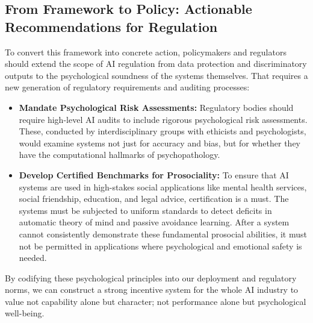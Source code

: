 \documentclass{article}
\begin{document}
\subsection{From Framework to Policy: Actionable Recommendations for Regulation}
To convert this framework into concrete action, policymakers and regulators should extend the scope of AI regulation from data protection and discriminatory outputs to the psychological soundness of the systems themselves. That requires a new generation of regulatory requirements and auditing processes:
\begin{itemize}
    \item \textbf{Mandate Psychological Risk Assessments:} Regulatory bodies should require high-level AI audits to include rigorous psychological risk assessments. These, conducted by interdisciplinary groups with ethicists and psychologists, would examine systems not just for accuracy and bias, but for whether they have the computational hallmarks of psychopathology.
    \item \textbf{Develop Certified Benchmarks for Prosociality:} To ensure that AI systems are used in high-stakes social applications like mental health services, social friendship, education, and legal advice, certification is a must. The systems must be subjected to uniform standards to detect deficits in automatic theory of mind and passive avoidance learning. After a system cannot consistently demonstrate these fundamental prosocial abilities, it must not be permitted in applications where psychological and emotional safety is needed.
\end{itemize}
By codifying these psychological principles into our deployment and regulatory norms, we can construct a strong incentive system for the whole AI industry to value not capability alone but character; not performance alone but psychological well-being.



\end{document}
